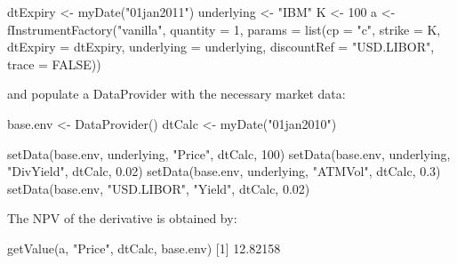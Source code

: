 \documentclass[justified]{tufte-book}
\newenvironment{Shaded}{}{}
\newcommand{\AttributeTok}[1]{\textcolor[rgb]{0.49,0.56,0.16}{#1}}
\newcommand{\ConstantTok}[1]{\textcolor[rgb]{0.53,0.00,0.00}{#1}}
\newcommand{\DecValTok}[1]{\textcolor[rgb]{0.25,0.63,0.44}{#1}}
\newcommand{\FloatTok}[1]{\textcolor[rgb]{0.25,0.63,0.44}{#1}}
\newcommand{\FunctionTok}[1]{\textcolor[rgb]{0.02,0.16,0.49}{#1}}
\newcommand{\NormalTok}[1]{#1}
\newcommand{\OtherTok}[1]{\textcolor[rgb]{0.00,0.44,0.13}{#1}}
\newcommand{\StringTok}[1]{\textcolor[rgb]{0.25,0.44,0.63}{#1}}
\begin{document}
\begin{Shaded}
\begin{Highlighting}[]
\NormalTok{dtExpiry }\OtherTok{\textless{}{-}} \FunctionTok{myDate}\NormalTok{(}\StringTok{"01jan2011"}\NormalTok{)}
\NormalTok{underlying }\OtherTok{\textless{}{-}} \StringTok{"IBM"}
\NormalTok{K }\OtherTok{\textless{}{-}} \DecValTok{100}
\NormalTok{a }\OtherTok{\textless{}{-}} \FunctionTok{fInstrumentFactory}\NormalTok{(}\StringTok{"vanilla"}\NormalTok{, }\AttributeTok{quantity =} \DecValTok{1}\NormalTok{, }\AttributeTok{params =} \FunctionTok{list}\NormalTok{(}\AttributeTok{cp =} \StringTok{"c"}\NormalTok{,}
    \AttributeTok{strike =}\NormalTok{ K, }\AttributeTok{dtExpiry =}\NormalTok{ dtExpiry, }\AttributeTok{underlying =}\NormalTok{ underlying,}
    \AttributeTok{discountRef =} \StringTok{"USD.LIBOR"}\NormalTok{, }\AttributeTok{trace =} \ConstantTok{FALSE}\NormalTok{))}
\end{Highlighting}
\end{Shaded}

and populate a DataProvider with the necessary market data:

\begin{Shaded}
\begin{Highlighting}[]
\NormalTok{base.env }\OtherTok{\textless{}{-}} \FunctionTok{DataProvider}\NormalTok{()}
\NormalTok{dtCalc }\OtherTok{\textless{}{-}} \FunctionTok{myDate}\NormalTok{(}\StringTok{"01jan2010"}\NormalTok{)}

\FunctionTok{setData}\NormalTok{(base.env, underlying, }\StringTok{"Price"}\NormalTok{, dtCalc, }\DecValTok{100}\NormalTok{)}
\FunctionTok{setData}\NormalTok{(base.env, underlying, }\StringTok{"DivYield"}\NormalTok{, dtCalc, }\FloatTok{0.02}\NormalTok{)}
\FunctionTok{setData}\NormalTok{(base.env, underlying, }\StringTok{"ATMVol"}\NormalTok{, dtCalc, }\FloatTok{0.3}\NormalTok{)}
\FunctionTok{setData}\NormalTok{(base.env, }\StringTok{"USD.LIBOR"}\NormalTok{, }\StringTok{"Yield"}\NormalTok{, dtCalc, }\FloatTok{0.02}\NormalTok{)}
\end{Highlighting}
\end{Shaded}

The NPV of the derivative is obtained by:

\begin{Shaded}
\begin{Highlighting}[]
\FunctionTok{getValue}\NormalTok{(a, }\StringTok{"Price"}\NormalTok{, dtCalc, base.env)}
\NormalTok{[}\DecValTok{1}\NormalTok{] }\FloatTok{12.82158}
\end{Highlighting}
\end{Shaded}
\end{document}
